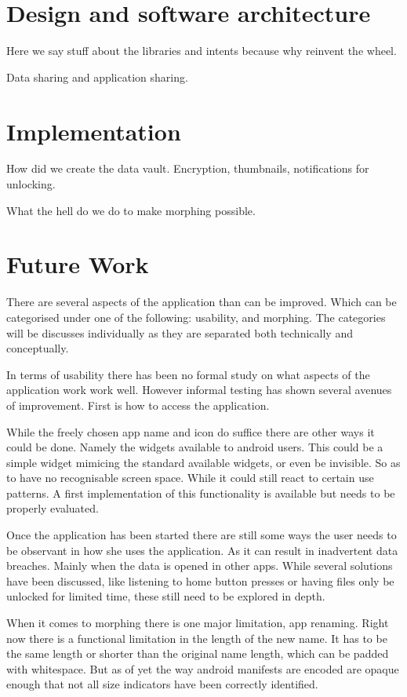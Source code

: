 \documentclass[twocolumn,english,compsoc,journal]{IEEEtran}
\begin{document}
\section{Design and software architecture}

Here we say stuff about the libraries and intents because why reinvent
the wheel.

Data sharing and application sharing.


\section{Implementation}

How did we create the data vault. Encryption, thumbnails, notifications
for unlocking.

What the hell do we do to make morphing possible.


\section{Future Work}

There are several aspects of the application than can be improved. Which
can be categorised under one of the following: usability, and morphing.
The categories will be discusses individually as they are separated both
technically and conceptually. 

In terms of usability there has been no formal study on what aspects of
the application work work well. However informal testing has shown several
avenues of improvement. First is how to access the application. 

While the freely chosen app name and icon do suffice there are other ways 
it could be done. Namely the widgets available to android users. This could 
be a simple widget mimicing the standard available widgets, or even be 
invisible. So as to have no recognisable screen space. While it could still
react to certain use patterns. A first implementation of this functionality is
available but needs to be properly evaluated.

Once the application has been started there are still some ways the user
needs to be observant in how she uses the application. As it can result in
inadvertent data breaches. Mainly when the data is opened in other apps.
While several solutions have been discussed, like listening to home button
presses or having files only be unlocked for limited time, these still need
to be explored in depth.

When it comes to morphing there is one major limitation, app renaming.
Right now there is a functional limitation in the length of the new name.
It has to be the same length or shorter than the original name length,
which can be padded with whitespace. But as of yet the way android
manifests are encoded are opaque enough that not all size indicators
have been correctly identified.
\end{document}
